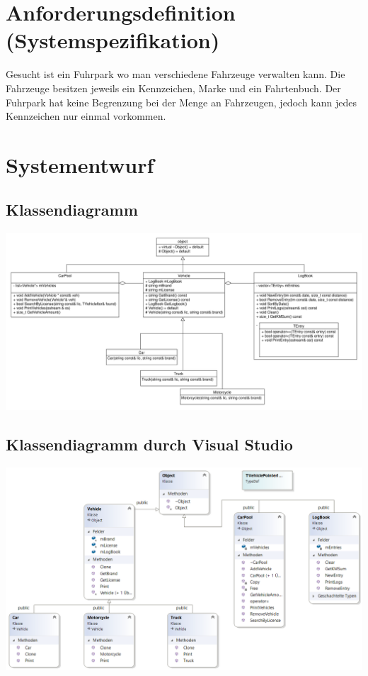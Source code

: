 \newpage
\section{Anforderungsdefinition (Systemspezifikation)}

Gesucht ist ein Fuhrpark wo man verschiedene Fahrzeuge verwalten kann. Die Fahrzeuge besitzen jeweils ein Kennzeichen, Marke und ein Fahrtenbuch.
Der Fuhrpark hat keine Begrenzung bei der Menge an Fahrzeugen, jedoch kann jedes Kennzeichen nur einmal vorkommen. 


\section{Systementwurf}

\subsection{Klassendiagramm}
 \includegraphics[scale = 0.40]{UML-Diagram.pdf}

\subsection{Klassendiagramm durch Visual Studio}
\includegraphics[scale=0.65]{./CarPool/ClassDiagram.png}

